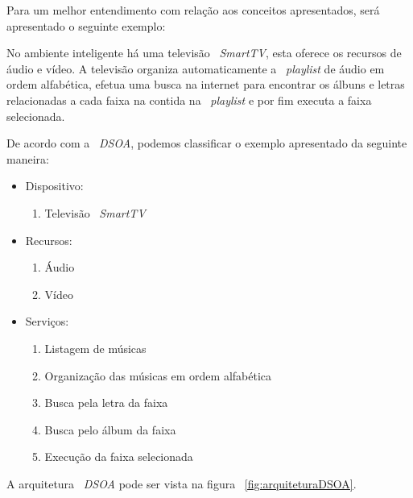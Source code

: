 		Para um melhor entendimento com relação aos conceitos apresentados, será apresentado o seguinte
		exemplo:
		
		No ambiente inteligente há uma televisão ~\textit{SmartTV}, esta oferece os recursos de
		áudio e vídeo. A televisão organiza automaticamente a ~\textit{playlist} de áudio em ordem
		alfabética, efetua uma busca na internet para encontrar os álbuns e letras relacionadas a cada
		faixa na contida na ~\textit{playlist} e por fim executa a faixa selecionada.
		
		De acordo com a ~\textit{DSOA}, podemos classificar o exemplo apresentado da seguinte maneira:
		
		\begin{itemize}
		  \item Dispositivo: 
		  
		  		\begin{enumerate}
		  		  \item Televisão ~\textit{SmartTV}
		  		\end{enumerate}
		  
		  \item Recursos: 
			
			  	\begin{enumerate}
			  	  \item Áudio
			  	  \item Vídeo
			  	\end{enumerate}
		  
		  \item Serviços: 
		   
		  		\begin{enumerate}
		  		  \item	Listagem de músicas 
		  		  \item Organização das músicas em ordem alfabética
		  		  \item Busca pela letra da faixa
		  		  \item Busca pelo álbum da faixa
		  		  \item Execução da faixa selecionada
		  		\end{enumerate}
		  		
		\end{itemize}


	A arquitetura ~\textit{DSOA} pode ser vista na figura ~\ref{fig:arquiteturaDSOA}.
	
